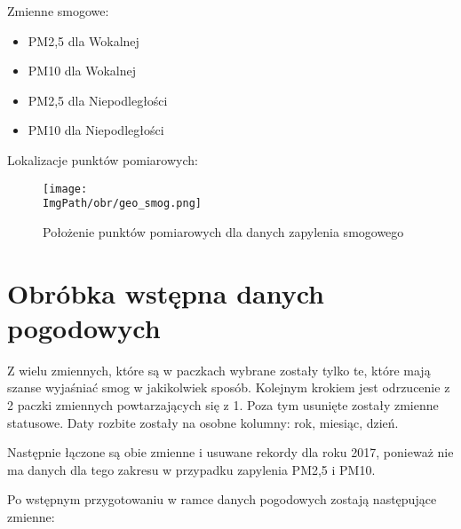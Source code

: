 \documentclass[a4paper,12pt,twoside,openany]{report}
\newcommand{\ImgPath}{.}
\begin{document}
Zmienne smogowe:

\begin{itemize}
	\item PM2,5 dla Wokalnej
	\item PM10 dla Wokalnej
	\item PM2,5 dla Niepodległości
	\item PM10 dla Niepodległości
\end{itemize}

Lokalizacje punktów pomiarowych:

\begin{figure}[H]
	\begin{center}
		\centering
		\texttt{[image: \\ImgPath/obr/geo\_smog.png]}
	\end{center}
	\caption{Położenie punktów pomiarowych dla danych zapylenia smogowego}
	\label{geogr_smog}
\end{figure}

\section{Obróbka wstępna danych pogodowych}

Z wielu zmiennych, które są w paczkach wybrane zostały tylko te, które mają szanse wyjaśniać smog w jakikolwiek sposób. Kolejnym krokiem jest odrzucenie z 2 paczki zmiennych powtarzających się z 1. Poza tym usunięte zostały zmienne statusowe. Daty rozbite zostały na osobne kolumny: rok, miesiąc, dzień.

Następnie łączone są obie zmienne i usuwane rekordy dla roku 2017, ponieważ nie ma danych dla tego zakresu w przypadku zapylenia PM2,5 i PM10.

Po wstępnym przygotowaniu w ramce danych pogodowych zostają następujące zmienne:
\end{document}
